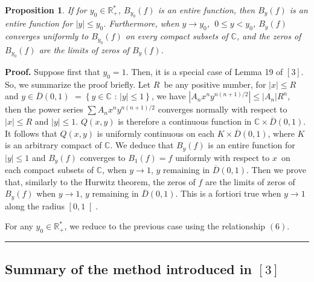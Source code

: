 \documentclass{article}
\newtheorem{proposition}[theorem]{Proposition}
\newenvironment{proof}[1][Proof]{\textbf{#1.} }{\ \rule{0.5em}{0.5em}}
\begin{document}
\begin{proposition}
If for $y_{0}\in \mathbb{R}_{+}^{\ast }$, $B_{y_{0}}\left( f\right) $ is an
entire function, then $B_{y}\left( f\right) $ is an entire function for $\left| y\right| \leq y_{0}$. Furthermore, when $y\rightarrow y_{0}$, $\
0\leq y<y_{0}$, $B_{y}\left( f\right) $ converges uniformly to $B_{y_{0}}\left( f\right) $ on every compact subsets of $\mathbb{C}$, and the
zeros of $B_{y_{0}}\left( f\right) $ are the limits of zeros of $B_{y}\left(
f\right) $.
\end{proposition}

\begin{proof}
\bigskip Suppose first that $y_{0}=1$. Then, it is a special case of Lemma
19 of $\left[ 3\right] $. So, we summarize the proof briefly. Let $R$\ be
any positive number, for $\left| x\right| \leq R$ and $y\in \overline{D}\left( 0,1\right) $ $=\left\{ y\in \mathbb{C}\text{ : }\left| y\right| \leq
1\right\} $, we have $\left| A_{n}x^{n}y^{n\left( n+1\right) /2}\right| \leq
\left| A_{n}\right| R^{n}$, then the power series $\sum A_{n}x^{n}y^{n\left(
n+1\right) /2}$ converges normally with respect to $\left| x\right| \leq R$
and $\left| y\right| \leq 1$. $Q\left( x,y\right) $ is therefore a
continuous function in $\mathbb{C}\times \overline{D}\left( 0,1\right) $. It
follows that $Q\left( x,y\right) $ is uniformly continuous on each $K\times 
\overline{D}\left( 0,1\right) $, where $K$ is an arbitrary compact of $\mathbb{C}$. We deduce that $B_{y}\left( f\right) $ is an entire function
for $\left| y\right| \leq 1$ and $B_{y}\left( f\right) $ converges to $B_{1}\left( f\right) =f$ uniformly with respect to $x$\ on each compact
subsets of $\mathbb{C}$, when $y\rightarrow 1$, $y$ remaining in $\overline{D}\left( 0,1\right) $. Then we prove that, similarly to the Hurwitz theorem,
the zeros of $f$ are the limits of zeros of $B_{y}\left( f\right) $ when $y\rightarrow 1$, $y$ remaining in $\overline{D}\left( 0,1\right) $. This is
a fortiori true when $y\longrightarrow 1$ along the radius $\left[ 0,1\right[
$.

For any $y_{0}\in \mathbb{R}_{+}^{\ast }$, we reduce to the previous case
using the relationship $\left( 6\right) $.
\end{proof}

\subsection{\protect\bigskip Summary of the method introduced in $\left[ 3\right] $}
\end{document}
